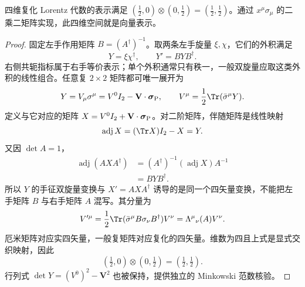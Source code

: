 \begin{proposition}[异手征旋量的向量表示]
四维复化 Lorentz 代数的表示满足 $(\tfrac12,0)\otimes(0,\tfrac12)=(\tfrac12,\tfrac12)$。通过 $x^\mu\sigma_\mu$ 的二乘二矩阵实现，此四维空间就是向量表示。
\end{proposition}
\begin{proof}
 固定左手作用矩阵 $B=(A^\dagger)^{-1}$。取两条左手旋量 $\xi,\chi$，它们的外积满足
\begin{equation*}
 Y=\xi\chi^\dagger,\qquad Y'=BYB^\dagger.
\end{equation*}
右侧共轭指标属于右手等价表示；单个外积通常只有秩一，一般双旋量应取这类外积的线性组合。任意复 $2\times2$ 矩阵都可唯一展开为
\begin{equation*}
 Y=V_\mu\sigma^\mu=V^0I_2-\mathbf V\cdot\boldsymbol\sigma_{\rm P},
 \qquad V^\mu=\frac12\Tr(\bar\sigma^\mu Y).
\end{equation*}
定义与它对应的矩阵 $X=V^0I_2+\mathbf V\cdot\boldsymbol\sigma_{\rm P}$。对二阶矩阵，伴随矩阵是线性映射
\begin{equation*}
 \operatorname{adj}X=(\Tr X)I_2-X=Y.
\end{equation*}
又因 $\det A=1$，
\begin{align*}
 \operatorname{adj}(AXA^\dagger)
 &=(A^\dagger)^{-1}(\operatorname{adj}X)A^{-1}\\
 &=BYB^\dagger.
\end{align*}
所以 $Y$ 的手征双旋量变换与 $X'=AXA^\dagger$ 诱导的是同一个四矢量变换，不能把左手矩阵 $B$ 与右手矩阵 $A$ 混写。其分量为
\begin{equation*}
 V'^\mu=\frac12\Tr(\bar\sigma^\mu B\sigma_\nu B^\dagger)V^\nu
 =\Lambda^\mu{}_{\nu}(A)V^\nu.
\end{equation*}
厄米矩阵对应实四矢量，一般复矩阵对应复化的四矢量。维数为四且上式是显式交织映射，因此
\begin{equation*}
 (\tfrac12,0)\otimes(0,\tfrac12)=(\tfrac12,\tfrac12).
\end{equation*}
行列式 $\det Y=(V^0)^2-\mathbf V^2$ 也被保持，提供独立的 Minkowski 范数核验。
\end{proof}

